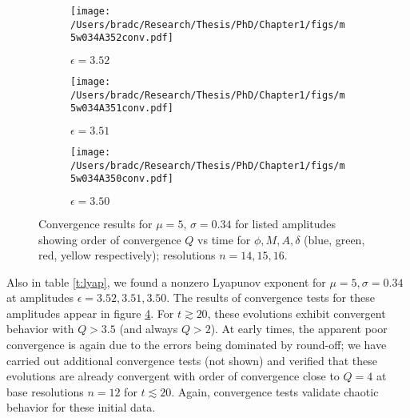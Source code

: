 \documentclass[../PhD.tex]{subfiles}
\begin{document}
\begin{subappendices}
\begin{figure}[!t]
\centering
\begin{subfigure}[t]{0.31\textwidth}
\texttt{[image: /Users/bradc/Research/Thesis/PhD/Chapter1/figs/m5w034A352conv.pdf]}
\caption{$\epsilon=3.52$}
\label{f:m5w034A352conv}
\end{subfigure}
\begin{subfigure}[t]{0.31\textwidth}
\texttt{[image: /Users/bradc/Research/Thesis/PhD/Chapter1/figs/m5w034A351conv.pdf]}
\caption{$\epsilon=3.51$}
\label{f:m5w034A351conv}
\end{subfigure}
\begin{subfigure}[t]{0.31\textwidth}
\texttt{[image: /Users/bradc/Research/Thesis/PhD/Chapter1/figs/m5w034A350conv.pdf]}
\caption{$\epsilon=3.50$}
\label{f:m5w034A350conv}
\end{subfigure}
\caption[Order of convergence for $\phi$, $M$, $A$, $\delta$ as a function of time for $\mu = 5$ at nearby amplitudes]{Convergence results for $\mu=5$, $\sigma=0.34$ for listed amplitudes
showing order of convergence $Q$ vs time for $\phi,M,A,\delta$ 
(blue, green, red, yellow respectively); resolutions $n=14,15,16$.
}
\label{f:m5w034convergence}
\end{figure}

Also in table \ref{t:lyap}, we found a nonzero Lyapunov exponent for 
$\mu=5,\sigma=0.34$ at amplitudes $\epsilon=3.52,3.51,3.50$.  The results
of convergence tests for these amplitudes appear in figure 
\ref{f:m5w034convergence}.  For $t\gtrsim 20$, these evolutions exhibit 
convergent behavior with $Q>3.5$ (and always $Q>2$).  At early times, the 
apparent poor convergence is again due to the errors being dominated by
round-off; we have carried out additional convergence tests (not shown) and
verified that these evolutions are already convergent with order of 
convergence close to $Q=4$ at base resolutions $n=12$ for $t\lesssim 20$.
Again, convergence tests validate chaotic behavior for these initial data.




\end{subappendices}
\end{document}

